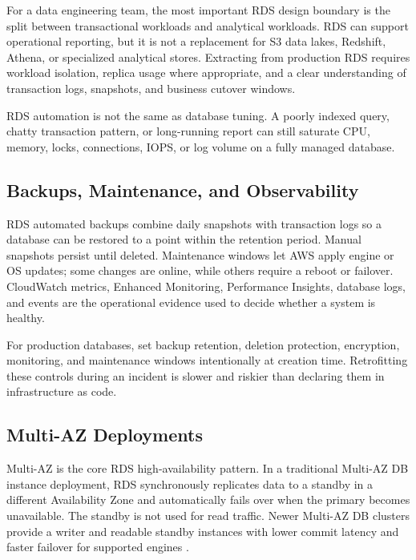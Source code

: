 For a data engineering team, the most important RDS design boundary is the split between transactional workloads and analytical workloads. RDS can support operational reporting, but it is not a replacement for S3 data lakes, Redshift, Athena, or specialized analytical stores. Extracting from production RDS requires workload isolation, replica usage where appropriate, and a clear understanding of transaction logs, snapshots, and business cutover windows.

\begin{notebox}
RDS automation is not the same as database tuning. A poorly indexed query, chatty transaction pattern, or long-running report can still saturate CPU, memory, locks, connections, IOPS, or log volume on a fully managed database.
\end{notebox}

\subsection{Backups, Maintenance, and Observability}
RDS automated backups combine daily snapshots with transaction logs so a database can be restored to a point within the retention period. Manual snapshots persist until deleted. Maintenance windows let AWS apply engine or OS updates; some changes are online, while others require a reboot or failover. CloudWatch metrics, Enhanced Monitoring, Performance Insights, database logs, and events are the operational evidence used to decide whether a system is healthy.

\begin{tipbox}
For production databases, set backup retention, deletion protection, encryption, monitoring, and maintenance windows intentionally at creation time. Retrofitting these controls during an incident is slower and riskier than declaring them in infrastructure as code.
\end{tipbox}

\subsection{Multi-AZ Deployments}
Multi-AZ is the core RDS high-availability pattern. In a traditional Multi-AZ DB instance deployment, RDS synchronously replicates data to a standby in a different Availability Zone and automatically fails over when the primary becomes unavailable. The standby is not used for read traffic. Newer Multi-AZ DB clusters provide a writer and readable standby instances with lower commit latency and faster failover for supported engines \cite{awsRDSMultiAZ}.

